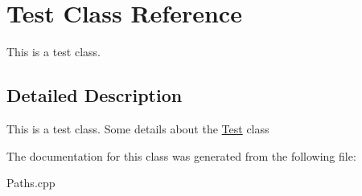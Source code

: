\hypertarget{classTest}{
\section{Test Class Reference}
\label{classTest}
}


This is a test class.  


\subsection{Detailed Description}
This is a test class. Some details about the \hyperlink{classTest}{Test} class 

The documentation for this class was generated from the following file:\begin{DoxyCompactItemize}
\item 
Paths.cpp\end{DoxyCompactItemize}
